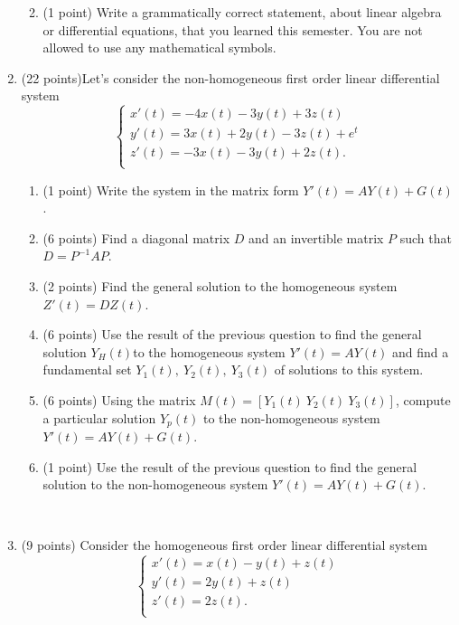 \documentclass{article}
\begin{document}
\begin{enumerate}
\begin{enumerate}
\vspace{2.5cm}


\item (1 point) Write a grammatically correct statement, about linear algebra or differential equations, that you learned this semester. You are not allowed to use any mathematical symbols. 
 \\
\end{enumerate}


\newpage

\item (22 points)Let's consider the non-homogeneous first order linear differential system
\begin{equation*}
  \left\{
        \begin{array}{l}
       x'(t)=-4x(t)-3y(t)+3z(t)\\
       y'(t)=3x(t)+2y(t)-3z(t)+e^t\\
       z'(t)=-3x(t)-3y(t)+2z(t).\\
        \end{array}
    \right.
\end{equation*}

\begin{enumerate}
\item (1 point) Write the system in the matrix form $Y'(t)= AY(t)+G(t)$.
\item (6 points) Find a diagonal matrix $D$ and an invertible matrix $P$ such that $D=P^{-1}AP$.
\item (2 points) Find the general solution to the homogeneous system $Z'(t)=DZ(t)$.
\item (6 points) Use the result of the previous question to find the general solution $Y_H(t)$to the homogeneous system $Y'(t)=AY(t)$ and find a fundamental set $Y_1(t),\ Y_2(t),\ Y_3(t)$ of solutions to this system.
\item (6 points) Using the matrix $M(t)=[Y_1(t) \ Y_2(t) \ Y_3(t)]$, compute a particular solution $Y_p(t)$ to the non-homogeneous system $Y'(t)= AY(t) + G(t)$.
\item (1 point) Use the result of the previous question to find the general solution to the non-homogeneous system $Y'(t)= AY(t) + G(t)$.   
\end{enumerate}

\newpage
\
\newpage

\item (9 points) Consider the homogeneous first order linear differential system
\begin{equation*}
  \left\{
        \begin{array}{l}
       x'(t)=x(t)-y(t)+z(t)\\
       y'(t)=2y(t)+z(t)\\
       z'(t)=2z(t).\\
        \end{array}
    \right.
\end{equation*}


\end{enumerate}
\end{document}
